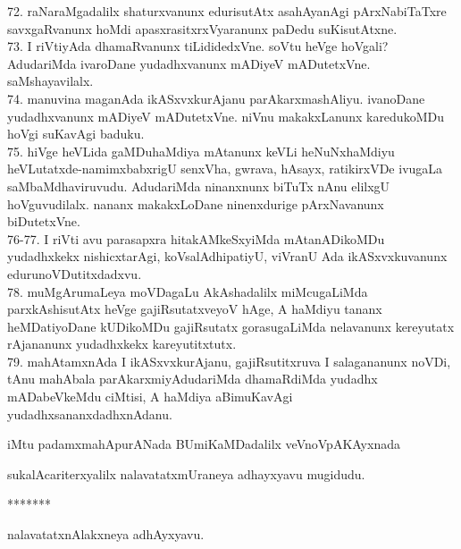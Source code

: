 \documentclass{article}
\begin{document}
72. raNaraMgadalilx shaturxvanunx edurisutAtx asahAyanAgi pArxNabiTaTxre savxgaRvanunx hoMdi apasxrasitxrxVyaranunx paDedu suKisutAtxne.\\
73. I riVtiyAda dhamaRvanunx tiLididedxVne. soVtu heVge hoVgali? AdudariMda ivaroDane yudadhxvanunx mADiyeV mADutetxVne. saMshayavilalx.\\
74. manuvina maganAda ikASxvxkurAjanu parAkarxmashAliyu. ivanoDane yudadhxvanunx mADiyeV mADutetxVne. niVnu makakxLanunx karedukoMDu hoVgi suKavAgi baduku.\\
75. hiVge heVLida gaMDuhaMdiya mAtanunx keVLi heNuNxhaMdiyu heVLutatxde-namimxbabxrigU senxVha, gwrava, hAsayx, ratikirxVDe ivugaLa saMbaMdhaviruvudu. AdudariMda ninanxnunx biTuTx nAnu elilxgU hoVguvudilalx. nananx makakxLoDane ninenxdurige pArxNavanunx biDutetxVne.\\
76-77. I riVti avu parasapxra hitakAMkeSxyiMda mAtanADikoMDu yudadhxkekx nishicxtarAgi, koVsalAdhipatiyU, viVranU Ada ikASxvxkuvanunx edurunoVDutitxdadxvu.\\
78. muMgArumaLeya moVDagaLu AkAshadalilx miMcugaLiMda parxkAshisutAtx heVge gajiRsutatxveyoV hAge, A haMdiyu tananx heMDatiyoDane kUDikoMDu gajiRsutatx gorasugaLiMda nelavanunx kereyutatx rAjananunx yudadhxkekx kareyutitxtutx.\\
79. mahAtamxnAda I ikASxvxkurAjanu, gajiRsutitxruva I salagananunx noVDi, tAnu mahAbala parAkarxmiyAdudariMda dhamaRdiMda yudadhx mADabeVkeMdu ciMtisi, A haMdiya aBimuKavAgi yudadhxsananxdadhxnAdanu.\\

\begin{center}
iMtu padamxmahApurANada BUmiKaMDadalilx veVnoVpAKAyxnada
\end{center}
\begin{center}
sukalAcariterxyalilx nalavatatxmUraneya adhayxyavu mugidudu.
\end{center}

\begin{center}
*******
\end{center}

\begin{center}
nalavatatxnAlakxneya adhAyxyavu.
\end{center}
\end{document}
